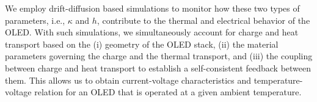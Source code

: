 \documentclass[%
9pt,
 aip,
rsi,%
 amsmath,amssymb,
preprint,%
]{revtex4-1}
\begin{document}

We employ drift-diffusion based simulations to monitor how these two types of parameters, i.e., $\kappa$ and $h$, contribute to the thermal and electrical behavior of the OLED.
With such simulations, we simultaneously account for charge and heat transport based on the (i) geometry of the OLED stack, (ii) the material parameters governing the charge and the thermal transport, and (iii) the coupling between charge and heat transport to establish a self-consistent feedback between them.
This allows us to obtain current-voltage characteristics and temperature-voltage relation for an OLED that is operated at a given ambient temperature. 

\end{document}
